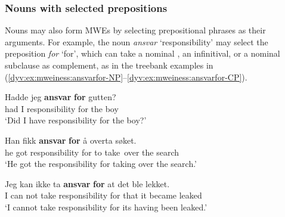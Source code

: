 \documentclass[output=paper]{langsci/langscibook}
\begin{document}
\subsubsection{Nouns with selected prepositions}\label{dyv:sec:mweiness:prepnoun}

Nouns may also form MWEs by selecting prepositional phrases as their arguments.
For example, the noun \textit{ansvar} `responsibility' may select the preposition \textit{for} `for', which can take a nominal , an infinitival, or a nominal subclause as complement, as in the treebank examples in (\ref{dyv:ex:mweiness:ansvarfor-NP}--\ref{dyv:ex:mweiness:ansvarfor-CP}).

\ea\label{dyv:ex:mweiness:ansvarfor-NP}
\gll Hadde jeg \textbf{ansvar} \textbf{for} gutten? \\
     had I responsibility for {the boy}\\
\glt `Did I have responsibility for the boy?'
\z


\ea\label{dyv:ex:mweiness:ansvarfor-inf}
\gll Han fikk \textbf{ansvar} \textbf{for} å overta søket. \\
     he got responsibility for to take over {the search}\\
\glt `He got the responsibility for taking over the search.'
\z


\ea\label{dyv:ex:mweiness:ansvarfor-CP}
\gll Jeg kan ikke ta \textbf{ansvar} \textbf{for} at det ble lekket. \\
    I can not take responsibility for that it became leaked\\
\glt `I cannot take responsibility for its having been leaked.'
\z
\end{document}
